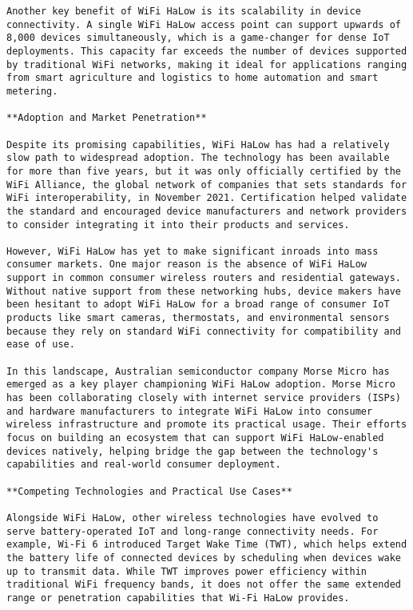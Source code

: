 \begin{verbatim}
Another key benefit of WiFi HaLow is its scalability in device connectivity. A single WiFi HaLow access point can support upwards of 8,000 devices simultaneously, which is a game-changer for dense IoT deployments. This capacity far exceeds the number of devices supported by traditional WiFi networks, making it ideal for applications ranging from smart agriculture and logistics to home automation and smart metering.

**Adoption and Market Penetration**

Despite its promising capabilities, WiFi HaLow has had a relatively slow path to widespread adoption. The technology has been available for more than five years, but it was only officially certified by the WiFi Alliance, the global network of companies that sets standards for WiFi interoperability, in November 2021. Certification helped validate the standard and encouraged device manufacturers and network providers to consider integrating it into their products and services.

However, WiFi HaLow has yet to make significant inroads into mass consumer markets. One major reason is the absence of WiFi HaLow support in common consumer wireless routers and residential gateways. Without native support from these networking hubs, device makers have been hesitant to adopt WiFi HaLow for a broad range of consumer IoT products like smart cameras, thermostats, and environmental sensors because they rely on standard WiFi connectivity for compatibility and ease of use.

In this landscape, Australian semiconductor company Morse Micro has emerged as a key player championing WiFi HaLow adoption. Morse Micro has been collaborating closely with internet service providers (ISPs) and hardware manufacturers to integrate WiFi HaLow into consumer wireless infrastructure and promote its practical usage. Their efforts focus on building an ecosystem that can support WiFi HaLow-enabled devices natively, helping bridge the gap between the technology's capabilities and real-world consumer deployment.

**Competing Technologies and Practical Use Cases**

Alongside WiFi HaLow, other wireless technologies have evolved to serve battery-operated IoT and long-range connectivity needs. For example, Wi-Fi 6 introduced Target Wake Time (TWT), which helps extend the battery life of connected devices by scheduling when devices wake up to transmit data. While TWT improves power efficiency within traditional WiFi frequency bands, it does not offer the same extended range or penetration capabilities that Wi-Fi HaLow provides.


\end{verbatim}
